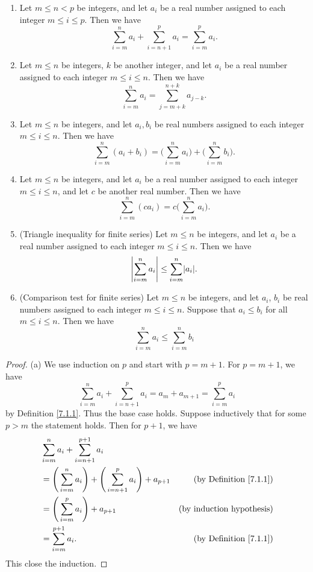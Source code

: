 \begin{lemma}\label{7.1.4}
    \mbox{}
    \begin{enumerate}
        \item Let \(m \leq n < p\) be integers, and let \(a_i\) be a real number assigned to each integer \(m \leq i \leq p\).
        Then we have
        \[
            \sum_{i = m}^n a_i + \sum_{i = n + 1}^p a_i = \sum_{i = m}^p a_i.
        \]
        \item Let \(m \leq n\) be integers, \(k\) be another integer, and let \(a_i\) be a real number assigned to each integer \(m \leq i \leq n\).
        Then we have
        \[
            \sum_{i = m}^n a_i = \sum_{j = m + k}^{n + k} a_{j - k}.
        \]
        \item Let \(m \leq n\) be integers, and let \(a_i, b_i\) be real numbers assigned to each integer \(m \leq i \leq n\).
        Then we have
        \[
            \sum_{i = m}^n (a_i + b_i) = \Bigg(\sum_{i = m}^n a_i\Bigg) + \Bigg(\sum_{i = m}^n b_i\Bigg).
        \]
        \item Let \(m \leq n\) be integers, and let \(a_i\) be a real number assigned to each integer \(m \leq i \leq n\), and let \(c\) be another real number.
        Then we have
        \[
            \sum_{i = m}^n (ca_i) = c\Bigg(\sum_{i = m}^n a_i\Bigg).
        \]
        \item (Triangle inequality for finite series)
        Let \(m \leq n\) be integers, and let \(a_i\) be a real number assigned to each integer \(m \leq i \leq n\).
        Then we have
        \[
            \abs*{\sum_{i = m}^n a_i} \leq \sum_{i = m}^n \abs*{a_i}.
        \]
        \item (Comparison test for finite series) Let \(m \leq n\) be integers, and let \(a_i\), \(b_i\) be real numbers assigned to each integer \(m \leq i \leq n\).
        Suppose that \(a_i \leq b_i\) for all \(m \leq i \leq n\).
        Then we have
        \[
            \sum_{i = m}^n a_i \leq \sum_{i = m}^n b_i
        \]
    \end{enumerate}
\end{lemma}

\begin{proof}{(a)}
We use induction on \(p\) and start with \(p = m + 1\).
For \(p = m + 1\), we have
\[
    \sum_{i = m}^n a_i + \sum_{i = n + 1}^p a_i = a_m + a_{m + 1} = \sum_{i = m}^p a_i
\]
by Definition \ref{7.1.1}.
Thus the base case holds.
Suppose inductively that for some \(p > m\) the statement holds.
Then for \(p + 1\), we have
\begin{align*}
& \sum_{i = m}^n a_i + \sum_{i = n + 1}^{p + 1} a_i \\
&= \Bigg(\sum_{i = m}^n a_i\Bigg) + \Bigg(\sum_{i = n + 1}^p a_i\Bigg) + a_{p + 1} & \text{(by Definition \ref{7.1.1})} \\
&= \Bigg(\sum_{i = m}^p a_i\Bigg) + a_{p + 1} & \text{(by induction hypothesis)} \\
&= \sum_{i = m}^{p + 1} a_i. & \text{(by Definition \ref{7.1.1})}
\end{align*}
This close the induction.
\end{proof}

